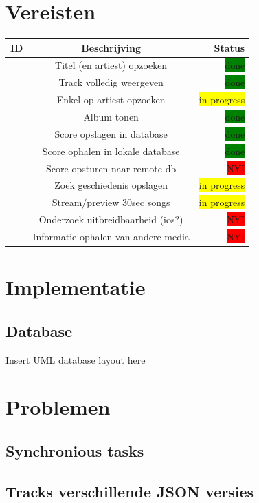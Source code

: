 \documentclass[11pt,a4paper]{article}
\newcommand{\boxgreen}{\colorbox{green}{\color{black}done}}
\newcommand{\boxyellow}{\colorbox{yellow}{\color{black}in progress}}
\newcommand{\boxred}{\colorbox{red}{\color{black}NYI}}
\newcounter{reqc}
\newcommand{\reqID} {%
   \stepcounter{reqc}%
   \thereqc}
\begin{document}
\section{Vereisten}
	\begin{tabular}{| l | c | r |}
	\hline
	ID 		& 	Beschrijving						& Status \\ \hline \hline
	\reqID	&	Titel (en artiest) opzoeken			& \boxgreen \\ \hline
	\reqID 	& 	Track volledig weergeven			& \boxgreen \\ \hline
	\reqID	& 	Enkel op artiest opzoeken 			& \boxyellow \\ \hline
	\reqID 	& 	Album tonen 						& \boxgreen \\ \hline
	\reqID	& 	Score opslagen in database 			& \boxgreen  \\ \hline
	\reqID 	& 	Score ophalen in lokale database 	& \boxgreen \\ \hline
	\reqID	& 	Score opsturen naar remote db		& \boxred \\ \hline
	\reqID	& 	Zoek geschiedenis opslagen			& \boxyellow \\ \hline
	\reqID	&	Stream$/$preview 30sec songs		& \boxyellow \\ \hline
	\reqID 	& 	Onderzoek uitbreidbaarheid (ios?)	& \boxred \\ \hline
	\reqID 	&	Informatie ophalen van andere media & \boxred \\ \hline
	
	\hline	
	\end{tabular}
\section{Implementatie}
	\subsection{Database}
	Insert UML database layout here
\section{Problemen}
	\subsection{Synchronious tasks}
	\subsection{Tracks verschillende JSON versies}
\end{document}
